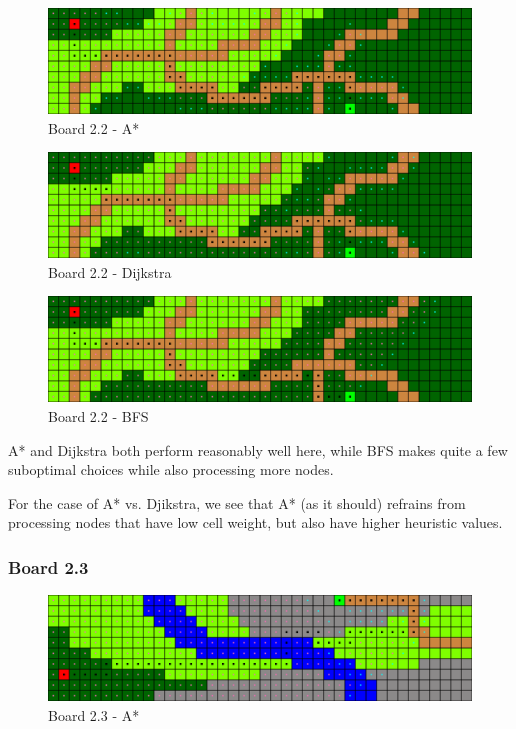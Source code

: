 \begin{figure}[h!]
  \centering
    \includegraphics[width=\textwidth]{img/board-2-2-astar}
    \caption{Board 2.2 - A*}
\end{figure}

\begin{figure}[h!]
  \centering
    \includegraphics[width=\textwidth]{img/board-2-2-dijkstra}
    \caption{Board 2.2 - Dijkstra}
\end{figure}

\begin{figure}[h!]
  \centering
    \includegraphics[width=\textwidth]{img/board-2-2-bfs}
    \caption{Board 2.2 - BFS}
\end{figure}

A* and Dijkstra both perform reasonably well here, while BFS makes quite a few
suboptimal choices while also processing more nodes.

For the case of A* vs. Djikstra, we see that A* (as it should) refrains from
processing nodes that have low cell weight, but also have higher heuristic values.

\newpage

\subsubsection*{Board 2.3}

\begin{figure}[h!]
  \centering
    \includegraphics[width=\textwidth]{img/board-2-3-astar}
    \caption{Board 2.3 - A*}
\end{figure}

